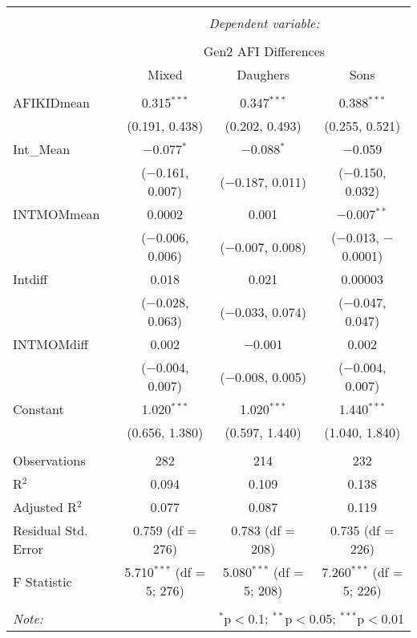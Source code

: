
\begingroup 
\small 
\begin{tabular}{@{\extracolsep{1pt}}lccc} 
\\[-1.8ex]\hline 
\hline \\[-1.8ex] 
 & \multicolumn{3}{c}{\textit{Dependent variable:}} \\ 
\cline{2-4} 
\\[-1.8ex] & \multicolumn{3}{c}{Gen2 AFI Differences} \\ 
 & Mixed & Daughers & Sons \\ 
\hline \\[-1.8ex] 
 AFIKIDmean & 0.315$^{***}$ & 0.347$^{***}$ & 0.388$^{***}$ \\ 
  & (0.191, 0.438) & (0.202, 0.493) & (0.255, 0.521) \\ 
  Int\_Mean & $-$0.077$^{*}$ & $-$0.088$^{*}$ & $-$0.059 \\ 
  & ($-$0.161, 0.007) & ($-$0.187, 0.011) & ($-$0.150, 0.032) \\ 
  INTMOMmean & 0.0002 & 0.001 & $-$0.007$^{**}$ \\ 
  & ($-$0.006, 0.006) & ($-$0.007, 0.008) & ($-$0.013, $-$0.0001) \\ 
  Intdiff & 0.018 & 0.021 & 0.00003 \\ 
  & ($-$0.028, 0.063) & ($-$0.033, 0.074) & ($-$0.047, 0.047) \\ 
  INTMOMdiff & 0.002 & $-$0.001 & 0.002 \\ 
  & ($-$0.004, 0.007) & ($-$0.008, 0.005) & ($-$0.004, 0.007) \\ 
  Constant & 1.020$^{***}$ & 1.020$^{***}$ & 1.440$^{***}$ \\ 
  & (0.656, 1.380) & (0.597, 1.440) & (1.040, 1.840) \\ 
 \hline \\[-1.8ex] 
Observations & 282 & 214 & 232 \\ 
R$^{2}$ & 0.094 & 0.109 & 0.138 \\ 
Adjusted R$^{2}$ & 0.077 & 0.087 & 0.119 \\ 
Residual Std. Error & 0.759 (df = 276) & 0.783 (df = 208) & 0.735 (df = 226) \\ 
F Statistic & 5.710$^{***}$ (df = 5; 276) & 5.080$^{***}$ (df = 5; 208) & 7.260$^{***}$ (df = 5; 226) \\ 
\hline 
\hline \\[-1.8ex] 
\textit{Note:}  & \multicolumn{3}{r}{$^{*}$p$<$0.1; $^{**}$p$<$0.05; $^{***}$p$<$0.01} \\ 
\end{tabular} 
\endgroup 
